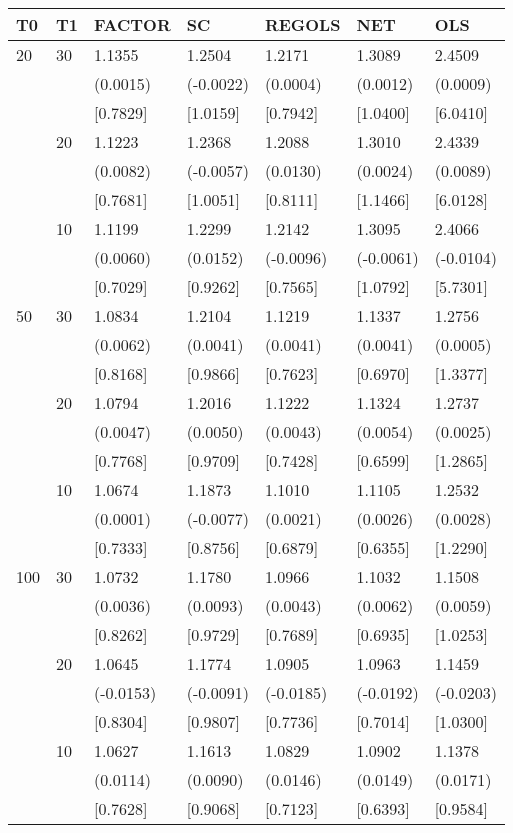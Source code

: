 \begin{table}[ht]
\centering
\begin{tabular}{lllllll}
\hline
T0&T1&FACTOR&SC&REGOLS&NET&OLS\\
\hline
20&30&1.1355&1.2504&1.2171&1.3089&2.4509\\
&&(0.0015)&(-0.0022)&(0.0004)&(0.0012)&(0.0009)\\
&&[0.7829]&[1.0159]&[0.7942]&[1.0400]&[6.0410]\\
&20&1.1223&1.2368&1.2088&1.3010&2.4339\\
&&(0.0082)&(-0.0057)&(0.0130)&(0.0024)&(0.0089)\\
&&[0.7681]&[1.0051]&[0.8111]&[1.1466]&[6.0128]\\
&10&1.1199&1.2299&1.2142&1.3095&2.4066\\
&&(0.0060)&(0.0152)&(-0.0096)&(-0.0061)&(-0.0104)\\
&&[0.7029]&[0.9262]&[0.7565]&[1.0792]&[5.7301]\\

50&30&1.0834&1.2104&1.1219&1.1337&1.2756\\
&&(0.0062)&(0.0041)&(0.0041)&(0.0041)&(0.0005)\\
&&[0.8168]&[0.9866]&[0.7623]&[0.6970]&[1.3377]\\
&20&1.0794&1.2016&1.1222&1.1324&1.2737\\
&&(0.0047)&(0.0050)&(0.0043)&(0.0054)&(0.0025)\\
&&[0.7768]&[0.9709]&[0.7428]&[0.6599]&[1.2865]\\
&10&1.0674&1.1873&1.1010&1.1105&1.2532\\
&&(0.0001)&(-0.0077)&(0.0021)&(0.0026)&(0.0028)\\
&&[0.7333]&[0.8756]&[0.6879]&[0.6355]&[1.2290]\\

100&30&1.0732&1.1780&1.0966&1.1032&1.1508\\
&&(0.0036)&(0.0093)&(0.0043)&(0.0062)&(0.0059)\\
&&[0.8262]&[0.9729]&[0.7689]&[0.6935]&[1.0253]\\
&20&1.0645&1.1774&1.0905&1.0963&1.1459\\
&&(-0.0153)&(-0.0091)&(-0.0185)&(-0.0192)&(-0.0203)\\
&&[0.8304]&[0.9807]&[0.7736]&[0.7014]&[1.0300]\\
&10&1.0627&1.1613&1.0829&1.0902&1.1378\\
&&(0.0114)&(0.0090)&(0.0146)&(0.0149)&(0.0171)\\
&&[0.7628]&[0.9068]&[0.7123]&[0.6393]&[0.9584]\\
\hline
\end{tabular}
\end{table}


